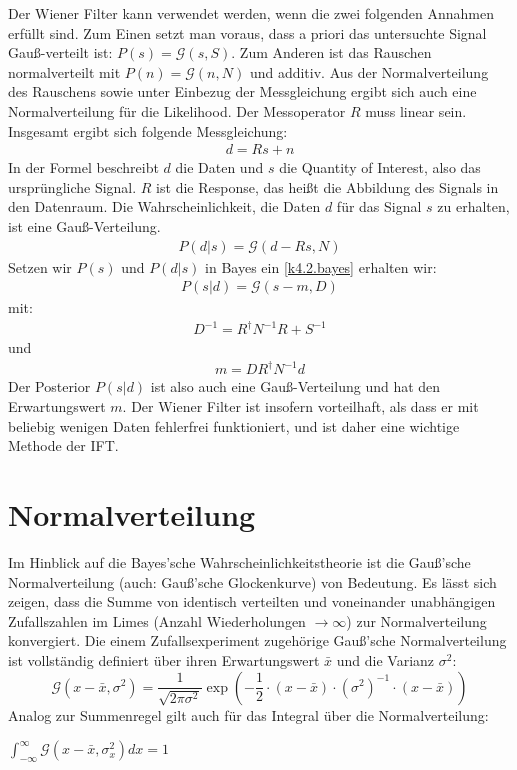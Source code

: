 \documentclass[]{dsadokumentation}
\begin{document}
Der Wiener Filter kann verwendet werden, wenn die zwei folgenden Annahmen erfüllt sind. Zum Einen setzt man voraus, dass a priori das untersuchte Signal Gauß-verteilt ist: $P(s) = \mathcal{G}(s,S)$. Zum Anderen ist das Rauschen normalverteilt mit $P(n) = \mathcal{G}(n,N)$ und additiv. Aus der Normalverteilung des Rauschens sowie unter Einbezug der Messgleichung ergibt sich auch eine Normalverteilung für die Likelihood. Der Messoperator $R$ muss linear sein. Insgesamt ergibt sich folgende Messgleichung:
\begin{eqnarray}
d = Rs + n
\end{eqnarray}
In der Formel beschreibt $d$ die Daten und $s$ die Quantity of Interest, also das ursprüngliche Signal. $R$ ist die Response, das heißt die Abbildung des Signals in den Datenraum. Die Wahrscheinlichkeit, die Daten $d$ für das Signal $s$ zu erhalten, ist eine Gauß-Verteilung.
\begin{eqnarray}
P(d|s) = \mathcal{G}(d-Rs,N)
\end{eqnarray}
Setzen wir $P(s)$ und $P(d|s)$ in Bayes ein \cref{k4.2.bayes} erhalten wir:
\begin{eqnarray}
P(s|d) = \mathcal{G}(s-m,D)
\end{eqnarray}
mit:
\begin{eqnarray}
D^{-1} = R^{\dagger} N^{-1}R + S^{-1}
\end{eqnarray}
und
\begin{eqnarray}
m = D R^{\dagger} N^{-1}d
\end{eqnarray}
Der Posterior $P(s|d)$ ist also auch eine Gauß-Verteilung und hat den Erwartungswert $m$. Der Wiener Filter ist insofern vorteilhaft, als dass er mit beliebig wenigen Daten fehlerfrei funktioniert, und ist daher eine wichtige Methode der IFT.


\section{Normalverteilung}

Im Hinblick auf die Bayes'sche Wahrscheinlichkeitstheorie ist die Gauß'sche Normalverteilung (auch: Gauß'sche Glockenkurve) von Bedeutung.
Es lässt sich zeigen, dass die Summe von identisch verteilten und voneinander unabhängigen Zufallszahlen im Limes (Anzahl Wiederholungen $\rightarrow \infty$) zur Normalverteilung konvergiert.
Die einem Zufallsexperiment zugehörige Gauß'sche Normalverteilung ist vollständig definiert über ihren Erwartungswert $\bar{x}$ und die Varianz $\sigma^{2}$:
\[ \mathcal{G} (x - \bar{x}, \sigma^{2}) = \displaystyle\frac{1}{\sqrt{2 \pi \sigma^{2}}} \exp \left(- \displaystyle\frac{1}{2} \cdot (x - \bar{x}) \cdot (\sigma^{2})^{-1} \cdot (x - \bar{x}) \right) \]
Analog zur Summenregel gilt auch für das Integral über die Normalverteilung:
\begin{center} $\int_{- \infty}^{\infty} \mathcal{G} (x - \bar{x}, \sigma _x ^{2}) dx = 1$ \end{center}
\end{document}
